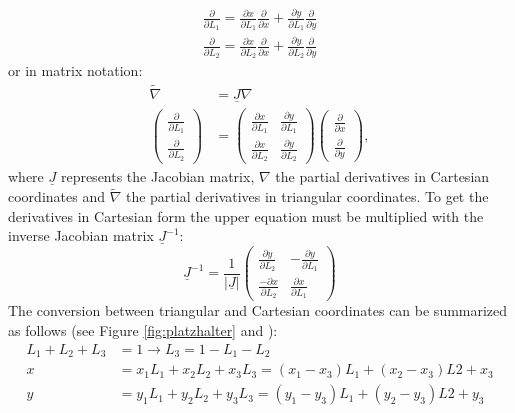   \begin{align}
  \frac{\partial}{\partial L_1} = \frac{\partial x}{\partial L_1} \frac{\partial}{\partial x} + \frac{\partial y}{\partial L_1} \frac{\partial}{\partial y} \nonumber\\
  \frac{\partial}{\partial L_2} = \frac{\partial x}{\partial L_2} \frac{\partial}{\partial x} + \frac{\partial y}{\partial L_2} \frac{\partial}{\partial y}
  \end{align}
  or in matrix notation:
  \begin{align}\label{eq:t3NablaTilde}
  \tilde{\nabla} &= \underline{J} \nabla \nonumber\\
  \begin{pmatrix}
  \frac{\partial}{\partial L_1}\\ \frac{\partial}{\partial L_2}
  \end{pmatrix} &= \begin{pmatrix}
  \frac{\partial x}{\partial L_1} & \frac{\partial y}{\partial L_1}\\
  \frac{\partial x}{\partial L_2} & \frac{\partial y}{\partial L_2}
  \end{pmatrix} \begin{pmatrix}
  \frac{\partial}{\partial x}\\ \frac{\partial}{\partial y}
  \end{pmatrix},
  \end{align}
  where $\underline{J}$ represents the Jacobian matrix, $\nabla$ the partial derivatives in Cartesian coordinates and $\tilde{\nabla}$ the partial derivatives in triangular coordinates. To get the derivatives in Cartesian form the upper equation must be multiplied with the inverse Jacobian matrix $\underline{J}^{-1}$:
  \begin{equation}
  \underline{J}^{-1} = \frac{1}{|\underline{J}|} \begin{pmatrix}
  \frac{\partial y}{\partial L_2} & -\frac{\partial y}{\partial L_1} \\
  \frac{-\partial x}{\partial L_2} & \frac{\partial x}{\partial L_1}
  \end{pmatrix}
  \end{equation}
  The conversion between triangular and Cartesian coordinates can be summarized as follows (see Figure \ref{fig:platzhalter} and \cite{steinke2005finite}):
  \begin{align}\label{eq:triCoord<->CartCoord}
  L_1 + L_2 + L_3 &= 1 \rightarrow L_3 = 1-L_1-L_2 \nonumber\\
  x &= x_1L_1 + x_2L_2 + x_3L_3 = (x_1-x_3)L_1 + (x_2-x_3)L2 + x_3\\
  y &= y_1L_1 + y_2L_2 + y_3L_3 = (y_1-y_3)L_1 + (y_2-y_3)L2 + y_3 \nonumber
  \end{align}
